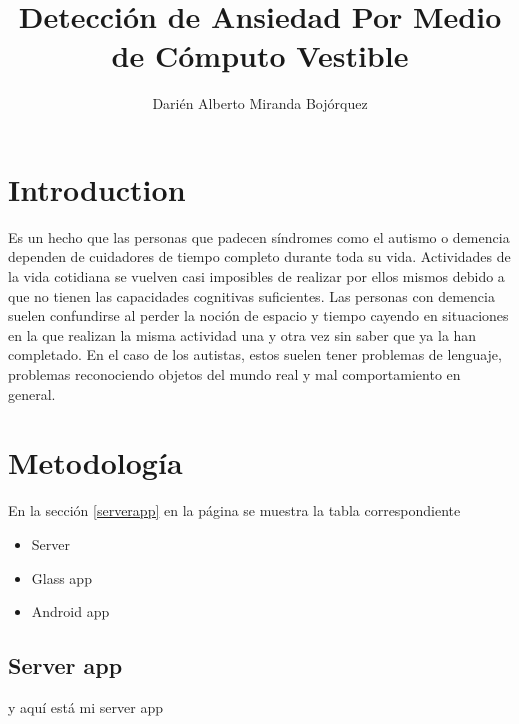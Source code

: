 \documentclass[letterpaper,12pt]{cicese}
\begin{document}
	\doublespace
	\title{Detecci\'on de Ansiedad Por Medio de C\'omputo Vestible}
	\author{Dari\'en Alberto Miranda Boj\'orquez}
	\maketitle
	\newpage
	\tableofcontents
	\newpage
		\chapter{Introduction}
		Es un hecho que las personas que padecen síndromes como el autismo o demencia dependen de cuidadores de tiempo completo durante toda su vida. Actividades de la vida cotidiana se vuelven casi imposibles de realizar por ellos mismos debido a que no tienen las capacidades cognitivas suficientes. Las personas con demencia suelen confundirse al perder la noción de espacio y tiempo cayendo en situaciones en la que realizan la misma actividad una y otra vez sin saber que ya la han completado. En el caso de los autistas, estos suelen tener problemas de lenguaje, problemas reconociendo objetos del mundo real y mal comportamiento en general. 
		\chapter{Metodolog\'ia}
			En la secci\'on \ref{serverapp} en la p\'agina \pageref{serverapp} se muestra la tabla correspondiente
			\begin{itemize}
			\item Server
			\item Glass app
			\item Android app
			\end{itemize}
		\section{Server app}
			y aqu\'i est\'a mi server app\label{serverapp}
	
\end{document}
